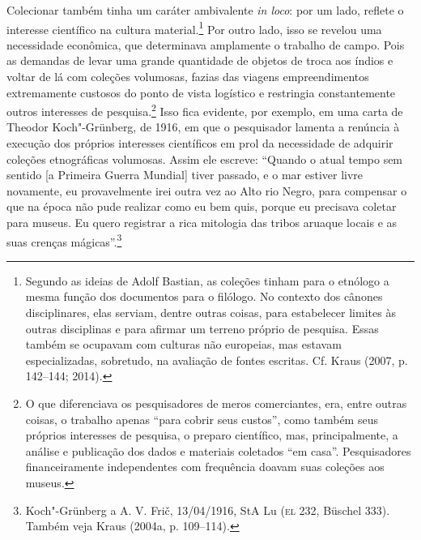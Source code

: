 Colecionar também tinha um caráter ambivalente \emph{in loco}: por um
lado, reflete o interesse científico na cultura material.\footnote{Segundo
  as ideias de Adolf Bastian, as coleções tinham para o etnólogo a mesma
  função dos documentos para o filólogo. No contexto dos cânones
  disciplinares, elas serviam, dentre outras coisas, para estabelecer
  limites às outras disciplinas e para afirmar um terreno próprio de
  pesquisa. Essas também se ocupavam com culturas não europeias, mas
  estavam especializadas, sobretudo, na avaliação de fontes escritas.
  Cf. Kraus (2007, p. 142--144; 2014).} Por outro lado, isso se revelou
uma necessidade econômica, que determinava amplamente o trabalho de
campo. Pois as demandas de levar uma grande quantidade de objetos de
troca aos índios e voltar de lá com coleções volumosas, fazias das
viagens empreendimentos extremamente custosos do ponto de vista
logístico e restringia constantemente outros interesses de
pesquisa.\footnote{O que diferenciava os pesquisadores de meros
  comerciantes, era, entre outras coisas, o trabalho apenas ``para
  cobrir seus custos'', como também seus próprios interesses de
  pesquisa, o preparo científico, mas, principalmente, a análise e
  publicação dos dados e materiais coletados ``em casa''. Pesquisadores
  financeiramente independentes com frequência doavam suas coleções aos
  museus.} Isso fica evidente, por exemplo, em uma carta de Theodor
Koch"-Grünberg, de 1916, em que o pesquisador lamenta a renúncia à
execução dos próprios interesses científicos em prol da necessidade de
adquirir coleções etnográficas volumosas. Assim ele escreve: ``Quando o
atual tempo sem sentido {[}a Primeira Guerra Mundial{]} tiver passado,
e o mar estiver livre novamente, eu provavelmente irei outra vez ao Alto
rio Negro, para compensar o que na época não pude realizar como eu bem
quis, porque eu precisava coletar para museus. Eu quero registrar a
rica mitologia das tribos aruaque locais e as suas crenças
mágicas''.\footnote{Koch"-Grünberg a A. V. Frič, 13/04/1916, StA Lu (\textsc{el}
  232, Büschel 333). Também veja Kraus (2004a, p. 109--114).}

